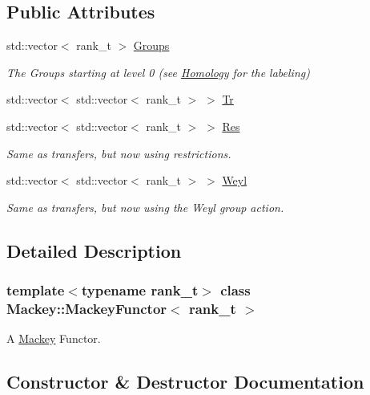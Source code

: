 \subsection*{Public Attributes}
\begin{DoxyCompactItemize}
\item 
std\+::vector$<$ rank\+\_\+t $>$ \hyperlink{classMackey_1_1MackeyFunctor_a4f8f5f7ac6267bdee2a67c8874bdd9a3}{Groups}
\begin{DoxyCompactList}\small\item\em The Groups starting at level 0 (see \hyperlink{classMackey_1_1Homology}{Homology} for the labeling) \end{DoxyCompactList}\item 
std\+::vector$<$ std\+::vector$<$ rank\+\_\+t $>$ $>$ \hyperlink{classMackey_1_1MackeyFunctor_a3106846b46d3eb4d297abe785bdb0481}{Tr}
\item 
std\+::vector$<$ std\+::vector$<$ rank\+\_\+t $>$ $>$ \hyperlink{classMackey_1_1MackeyFunctor_a9299f915835edaa2b67880bfe6330502}{Res}
\begin{DoxyCompactList}\small\item\em Same as transfers, but now using restrictions. \end{DoxyCompactList}\item 
std\+::vector$<$ std\+::vector$<$ rank\+\_\+t $>$ $>$ \hyperlink{classMackey_1_1MackeyFunctor_aa6488386f0731b1a2c80b494376709a0}{Weyl}
\begin{DoxyCompactList}\small\item\em Same as transfers, but now using the Weyl group action. \end{DoxyCompactList}\end{DoxyCompactItemize}


\subsection{Detailed Description}
\subsubsection*{template$<$typename rank\+\_\+t$>$\newline
class Mackey\+::\+Mackey\+Functor$<$ rank\+\_\+t $>$}

A \hyperlink{namespaceMackey}{Mackey} Functor. 

\subsection{Constructor \& Destructor Documentation}
\mbox{\label{classMackey_1_1MackeyFunctor_a075cd364217700d5f5c2459d4a988a93}} 
